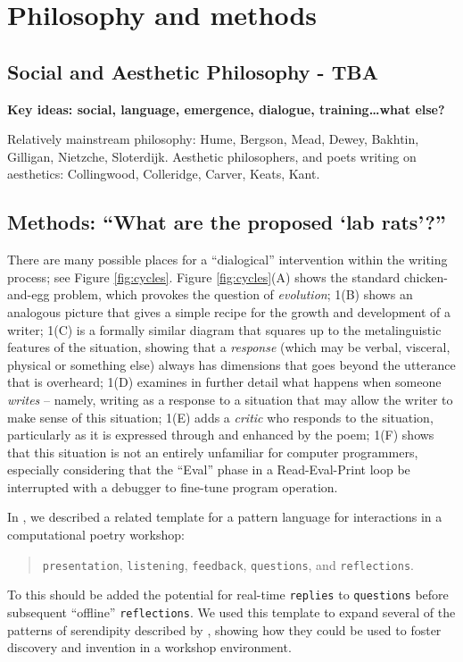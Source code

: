 \section{Philosophy and methods}
\label{sec:philosophy_and_methods}

\subsection{Social and Aesthetic Philosophy - TBA}
\label{sec:philosophy}

\begin{mdframed}
\textbf{Key ideas: social, language, emergence, dialogue, training\ldots what else?}

Relatively mainstream philosophy: Hume, Bergson, Mead, Dewey, Bakhtin,
Gilligan, Nietzche, Sloterdijk.  Aesthetic philosophers, and poets
writing on aesthetics: Collingwood, Colleridge, Carver, Keats, Kant.
\end{mdframed}

\subsection{Methods: ``What are the proposed `lab rats'?''}
\label{sec:methods}



There are many possible places for a ``dialogical'' intervention
within the writing process; see Figure \ref{fig:cycles}.  Figure
\ref{fig:cycles}(A) shows the standard chicken-and-egg problem, which
provokes the question of \emph{evolution}; 1(B) shows an analogous
picture that gives a simple recipe for the growth and development of a
writer; 1(C) is a formally similar diagram that squares up to the
metalinguistic features of the situation, showing that a
\emph{response} (which may be verbal, visceral, physical or something
else) always has dimensions that goes beyond the utterance that is
overheard; 1(D) examines in further detail what happens when someone
\emph{writes} -- namely, writing as a response to a situation that may
allow the writer to make sense of this situation; 1(E) adds a
\emph{critic} who responds to the situation, particularly as it is
expressed through and enhanced by the poem; 1(F) shows that this
situation is not an entirely unfamiliar for computer programmers,
especially considering that the ``Eval'' phase in a Read-Eval-Print
loop be interrupted with a debugger to fine-tune program operation.

In \cite{serendipity-arxiv}, we described a related template for a
pattern language for interactions in a computational poetry workshop:
\begin{quote}
{\tt presentation}, {\tt listening}, {\tt feedback}, {\tt questions}, and
{\tt reflections}.
\end{quote}
To this should be added the potential for real-time {\tt replies} to
{\tt questions} before subsequent ``offline'' {\tt reflections}.  We
used this template to expand several of the patterns of serendipity
described by \cite{van1994anatomy}, showing how they could be used to
foster discovery and invention in a workshop environment.

